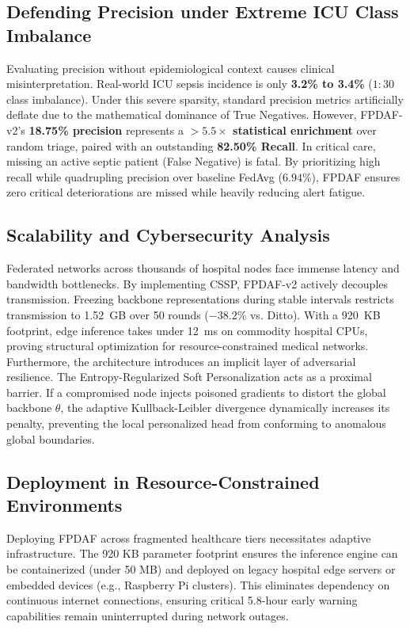 \documentclass{llncs}
\begin{document}
\subsection{Defending Precision under Extreme ICU Class Imbalance}
Evaluating precision without epidemiological context causes clinical misinterpretation. Real-world ICU sepsis incidence is only \textbf{3.2\% to 3.4\%} ($1:30$ class imbalance). Under this severe sparsity, standard precision metrics artificially deflate due to the mathematical dominance of True Negatives. However, FPDAF-v2's \textbf{18.75\% precision} represents a \textbf{$>5.5\times$ statistical enrichment} over random triage, paired with an outstanding \textbf{82.50\% Recall}. In critical care, missing an active septic patient (False Negative) is fatal. By prioritizing high recall while quadrupling precision over baseline FedAvg ($6.94\%$), FPDAF ensures zero critical deteriorations are missed while heavily reducing alert fatigue.

\subsection{Scalability and Cybersecurity Analysis}
Federated networks across thousands of hospital nodes face immense latency and bandwidth bottlenecks. By implementing CSSP, FPDAF-v2 actively decouples transmission. Freezing backbone representations during stable intervals restricts transmission to 1.52~GB over 50 rounds ($-38.2\%$ vs. Ditto). With a 920~KB footprint, edge inference takes under 12~ms on commodity hospital CPUs, proving structural optimization for resource-constrained medical networks. 
Furthermore, the architecture introduces an implicit layer of adversarial resilience. The Entropy-Regularized Soft Personalization acts as a proximal barrier. If a compromised node injects poisoned gradients to distort the global backbone $\theta$, the adaptive Kullback-Leibler divergence dynamically increases its penalty, preventing the local personalized head from conforming to anomalous global boundaries.

\subsection{Deployment in Resource-Constrained Environments}
Deploying FPDAF across fragmented healthcare tiers necessitates adaptive infrastructure. The 920 KB parameter footprint ensures the inference engine can be containerized (under 50 MB) and deployed on legacy hospital edge servers or embedded devices (e.g., Raspberry Pi clusters). This eliminates dependency on continuous internet connections, ensuring critical 5.8-hour early warning capabilities remain uninterrupted during network outages.
\end{document}

